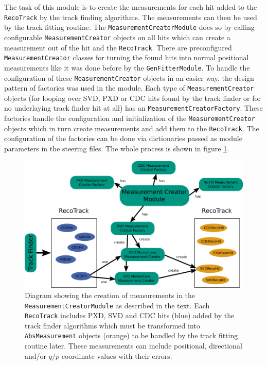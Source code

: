 The task of this module is to create the measurements for each hit added to the \texttt{RecoTrack} by the track finding algorithms. The measurements can then be used by the track fitting routine. The \texttt{MeasurementCreatorModule} does so by calling configurable \texttt{MeasurementCreator} objects on all hits which can create a measurement out of the hit and the \texttt{RecoTrack}. There are preconfigured \texttt{MeasurementCreator} classes for turning the found hits into normal positional measurements like it was done before by the \texttt{GenFitterModule}. To handle the configuration of these \texttt{MeasurementCreator} objects in an easier way, the design pattern of factories was used in the module. Each type of \texttt{MeasurementCreator} objects (for looping over SVD, PXD or CDC hits found by the track finder or for no underlaying track finder hit at all) has an \texttt{MeasurementCreatorFactory}. These factories handle the configuration and initialization of the \texttt{MeasurementCreator} objects which in turn create measurements and add them to the \texttt{RecoTrack}. The configuration of the factories can be done via dictionaries passed as module parameters in the steering files. The whole process is shown in figure \ref{fig-measurement-creator}.

\begin{figure}
  \centering
  \includegraphics[width=\linewidth]{figures/vxd/measurementCreator.pdf}
  \caption[Diagram showing the creation of measurements.]{Diagram showing the creation of measurements in the \texttt{MeasurementCreatorModule} as described in the text. Each \texttt{RecoTrack} includes PXD, SVD and CDC hits (blue) added by the track finder algorithms which must be transformed into \texttt{AbsMeasurement} objects (orange) to be handled by the track fitting routine later. These measurements can include positional, directional and/or $q/p$ coordinate values with their errors.}
  \label{fig-measurement-creator}
\end{figure}

